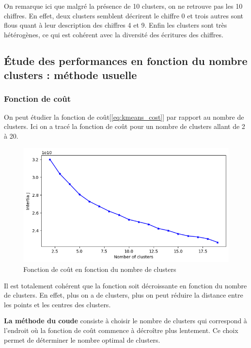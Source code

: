 \documentclass[french,a4paper,18pt]{article}
\begin{document}
On remarque ici que malgré la présence de 10 clusters, on ne retrouve pas les 10 chiffres.
En effet, deux clusters semblent décrirent le chiffre 0 et trois autres sont flous quant à leur description des chiffres 4 et 9.
Enfin les clusters sont très hétérogènes, ce qui est cohérent avec la diversité des écritures des chiffres.

\subsection{Étude des performances en fonction du nombre clusters : méthode usuelle}

\subsubsection{Fonction de coût}
On peut étudier la fonction de coût[\ref{eq:kmeans_cost}] par rapport au nombre de clusters.
Ici on a tracé la fonction de coût pour un nombre de clusters allant de 2 à 20.

\begin{figure}[h!]
    \centering
    \includegraphics[scale=0.4]{../images/mnist_kmeans_inertia.png}
    \caption{Fonction de coût en fonction du nombre de clusters}\label{fig:mnist_kmeans_cost}
\end{figure}

Il est totalement cohérent que la fonction soit décroissante en fonction du nombre de clusters.
En effet, plus on a de clusters, plus on peut réduire la distance entre les points et les centres des clusters.

\textbf{La méthode du coude} consiste à choisir le nombre de clusters qui correspond à l'endroit où la fonction de coût commence à décroître plus lentement.
Ce choix permet de déterminer le nombre optimal de clusters.
\end{document}
